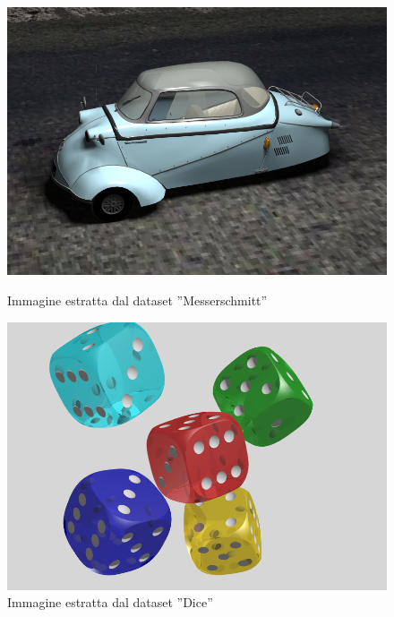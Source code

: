 \begin{figure}[ht]
    \begin{minipage}[b]{0.32\linewidth}
        \centering
        \includegraphics[width=\linewidth]{img/Messerschmitt.png}
        \caption{Immagine estratta dal dataset ”Messerschmitt”}
        \label{fig:Messerschmitt}
    \end{minipage}
    \hfill
    \begin{minipage}[b]{0.32\linewidth}
        \centering
        \includegraphics[width=\linewidth]{img/Dice.png}
        \caption{Immagine estratta dal dataset ”Dice”}
        \label{fig:Dice}
    \end{minipage}
\end{figure}

